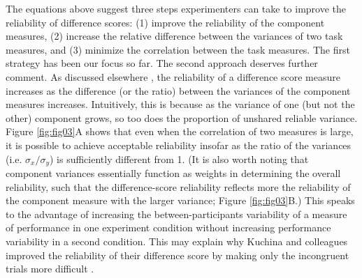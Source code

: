 \documentclass[a4paper,12pt]{article}
\begin{document}
The equations above suggest three steps experimenters can take to improve the reliability of difference scores: (1) improve the reliability of the component measures, (2) increase the relative difference between the variances of two task measures, and (3) minimize the correlation between the task measures. The first strategy has been our focus so far. The second approach deserves further comment. As discussed elsewhere \cite{chiou1996reliability}, the reliability of a difference score measure increases as the difference (or the ratio) between the variances of the component measures increases. Intuitively, this is because as the variance of one (but not the other) component grows, so too does the proportion of unshared reliable variance. Figure \ref{fig:fig03}A shows that even when the correlation of two measures is large, it is possible to achieve acceptable reliability insofar as the ratio of the variances (i.e. $\sigma_x / \sigma_y$) is sufficiently different from 1. (It is also worth noting that component variances essentially function as weights in determining the overall reliability, such that the difference-score reliability reflects more the reliability of the component measure with the larger variance; Figure \ref{fig:fig03}B.) This speaks to the advantage of increasing the between-participants variability of a measure of performance in one experiment condition without increasing performance variability in a second condition. This may explain why Kuchina and colleagues improved the reliability of their difference score by making only the incongruent trials more difficult \cite{kucina2022solution}.
\end{document}
